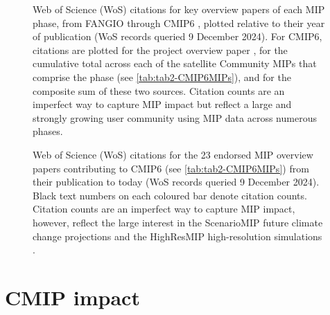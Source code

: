 \documentclass[manuscript]{copernicus}
\newcommand{\mycomment}[1]{}
\begin{document}
\begin{figure}
    \centering
    
    \caption{Web of Science (WoS) citations for key overview papers of each MIP phase, from FANGIO \citep{cess_intercomparison_1990} through CMIP6 \citep{eyring_overview_2016}, plotted relative to their year of publication (WoS records queried 9 December 2024). For CMIP6, citations are plotted for the project overview paper \citep{eyring_overview_2016}, for the cumulative total across each of the satellite Community MIPs that comprise the phase (see \autoref{tab:tab2-CMIP6MIPs}), and for the composite sum of these two sources. Citation counts are an imperfect way to capture MIP impact but reflect a large and strongly growing user community using MIP data across numerous phases.}
    \label{fig:fig3-MIPPhaseCitations}
\end{figure}


\begin{figure}
    \centering
    
    \caption{Web of Science (WoS) citations for the 23 endorsed MIP overview papers contributing to CMIP6 (see \autoref{tab:tab2-CMIP6MIPs}) from their publication to today (WoS records queried 9 December 2024). Black text numbers on each coloured bar denote citation counts. Citation counts are an imperfect way to capture MIP impact, however, reflect the large interest in the ScenarioMIP future climate change projections \citep{oneill_scenario_2016} and the HighResMIP high-resolution simulations \citep{haarsma_high_2016}.}
    \label{fig:fig4-MIPCitations}
\end{figure}


\section{CMIP impact}
\label{sec:CMIP6Impact}
\mycomment{
Ron S: This greatly undersells CMIP. The IPCC, as we know it, would not exist without CMIP. This paper can claim a lot of the IPCC’s impact on society. Organizing climate scientists, data scientists, networking scientists (and so on) is another big factor leading to CMIP’s success. Getting funder buy-in is also a huge factor.
CMIP undersold - One idea is to count the number of figures in the various IPCC SPMs that contain CMIP data. I would guess that it is about half of them. Counting references in the IPCC that use CMIP data is harder and more time-consuming. I would not recommend this path. :)
I think a summary sentence like "The IPCC has achieved remarkable success; CMIP has allowed much of that success to occur" could get by the reviewers. In a sense, the whole paper supports this statement. Another point is that CMIP would succeed without the IPCC; you can't say the reverse.
Then, we will discuss what made CMIP successful—science insights, common data formats, common variable naming, detailed internet protocols, etc., and above all, lots of volunteers—people with a vision.
}
\end{document}
